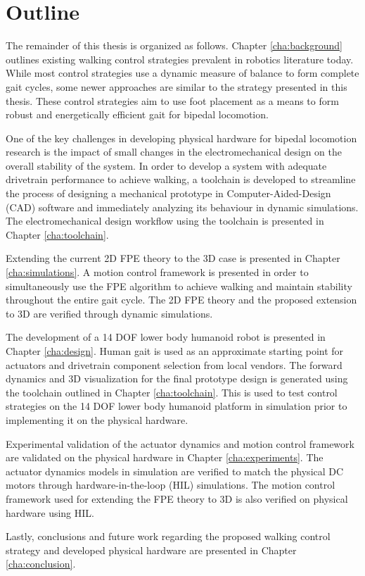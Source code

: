 \section{Outline} %
\label{sec:outline}
The remainder of this thesis is organized as follows. Chapter \ref{cha:background} outlines existing walking control strategies prevalent in robotics literature today. While most control strategies use a dynamic measure of balance to form complete gait cycles, some newer approaches are similar to the strategy presented in this thesis. These control strategies aim to use foot placement as a means to form robust and energetically efficient gait for bipedal locomotion. 

One of the key challenges in developing physical hardware for bipedal locomotion research is the impact of small changes in the electromechanical design on the overall stability of the system. In order to develop a system with adequate drivetrain performance to achieve walking, a toolchain is developed to streamline the process of designing a mechanical prototype in Computer-Aided-Design (CAD) software and immediately analyzing its behaviour in dynamic simulations. The electromechanical design workflow using the toolchain is presented in Chapter \ref{cha:toolchain}.

Extending the current 2D FPE theory to the 3D case is presented in Chapter \ref{cha:simulations}. A motion control framework is presented in order to simultaneously use the FPE algorithm to achieve walking and maintain stability throughout the entire gait cycle. The 2D FPE theory and the proposed extension to 3D are verified through dynamic simulations. 

The development of a 14 DOF lower body humanoid robot is presented in Chapter \ref{cha:design}. Human gait is used as an approximate starting point for actuators and drivetrain component selection from local vendors. The forward dynamics and 3D visualization for the final prototype design is generated using the toolchain outlined in Chapter \ref{cha:toolchain}. This is used to test control strategies on the 14 DOF lower body humanoid platform in simulation prior to implementing it on the physical hardware. 

Experimental validation of the actuator dynamics and motion control framework are validated on the physical hardware in Chapter \ref{cha:experiments}. The actuator dynamics models in simulation are verified to match the physical DC motors through hardware-in-the-loop (HIL) simulations. The motion control framework used for extending the FPE theory to 3D is also verified on physical hardware using HIL.  

Lastly, conclusions and future work regarding the proposed walking control strategy and developed physical hardware are presented in Chapter \ref{cha:conclusion}. 

